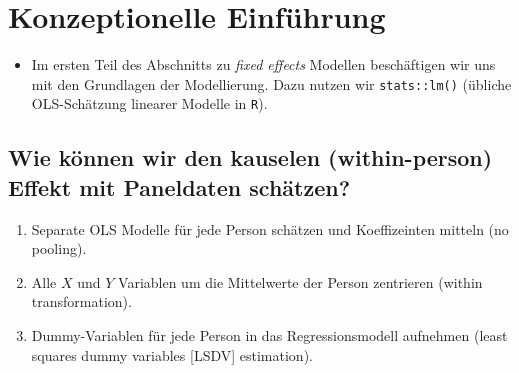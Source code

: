 \documentclass[]{book}
\providecommand{\tightlist}{%
  \setlength{\itemsep}{0pt}\setlength{\parskip}{0pt}}
\begin{document}
\hypertarget{konzeptionelle-einfuxfchrung}{%
\section{Konzeptionelle Einführung}\label{konzeptionelle-einfuxfchrung}}

\begin{itemize}
\tightlist
\item
  Im ersten Teil des Abschnitts zu \emph{fixed effects} Modellen beschäftigen wir uns mit den Grundlagen der Modellierung. Dazu nutzen wir \texttt{stats::lm()} (übliche OLS-Schätzung linearer Modelle in \texttt{R}).
\end{itemize}

\hypertarget{wie-kuxf6nnen-wir-den-kauselen-within-person-effekt-mit-paneldaten-schuxe4tzen}{%
\subsection*{Wie können wir den kauselen (within-person) Effekt mit Paneldaten schätzen?}\label{wie-kuxf6nnen-wir-den-kauselen-within-person-effekt-mit-paneldaten-schuxe4tzen}}

\begin{enumerate}
\def\labelenumi{\arabic{enumi})}
\tightlist
\item
  Separate OLS Modelle für jede Person schätzen und Koeffizeinten mitteln (no pooling).
\item
  Alle \(X\) und \(Y\) Variablen um die Mittelwerte der Person zentrieren (within transformation).
\item
  Dummy-Variablen für jede Person in das Regressionsmodell aufnehmen (least squares dummy variables {[}LSDV{]} estimation).
\end{enumerate}
\end{document}
